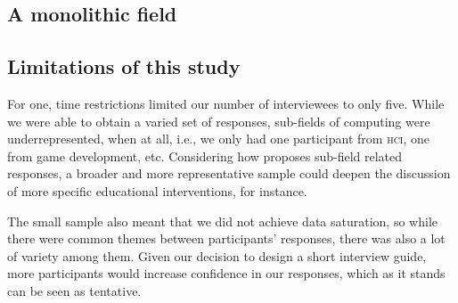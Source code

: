\subsection{A monolithic field}

\subsection{Limitations of this study}
For one, time restrictions limited our number of interviewees to only five. While we were able to obtain a varied set of responses, sub-fields of computing were underrepresented, when at all, i.e., we only had one participant from \textsc{hci}, one from game development, etc. Considering how \cite{easterbrook2010climate} proposes sub-field related responses, a broader and more representative sample could deepen the discussion of more specific educational interventions, for instance.

The small sample also meant that we did not achieve data saturation, so while there were common themes between participants' responses, there was also a lot of variety among them. Given our decision to design a short interview guide, more participants would increase confidence in our responses, which as it stands can be seen as tentative.